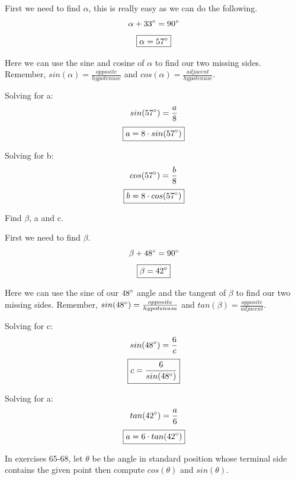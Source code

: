 \documentclass[10pt,letterpaper]{amspset}
\begin{document}
\begin{solution}[Solution]
First we need to find $\alpha$, this is really easy as we can do the following.
\[\alpha + 33\degree = 90\degree\]
\[\boxed{\alpha = 57\degree}\]

\noindent  Here we can use the sine and cosine of $\alpha$ to find our two missing sides. Remember, $sin(\alpha) = \frac{opposite}{hypotenuse}$ and $cos(\alpha) = \frac{adjacent}{hypotenuse}$. 
\bigskip

Solving for a:
\[sin(57\degree) = \frac{a}{8} \]
\[\boxed{a = 8 \cdot sin(57\degree)}\]

\bigskip

Solving for b:
\[cos(57\degree) = \frac{b}{8}\]
\[\boxed{b = 8 \cdot cos(57\degree)}\]
\end{solution}


\pagebreak


\begin{problem}[58.]
Find $\beta$, a and c.

\end{problem}

\begin{solution}[Solution]
First we need to find $\beta$.
\[\beta + 48\degree = 90\degree\]
\[\boxed{\beta = 42\degree}\]

\noindent  Here we can use the sine of our $48\degree$ angle and the tangent of $\beta$ to find our two missing sides. Remember, $sin(48\degree) = \frac{opposite}{hypotenuse}$ and $tan(\beta) = \frac{opposite}{adjacent}$. \bigskip

Solving for c:
\[sin(48\degree) = \frac{6}{c} \]
\[\boxed{c = \frac{6}{sin(48\degree)}}\]

\bigskip

Solving for a:
\[tan(42\degree) = \frac{a}{6}\]
\[\boxed{a = 6 \cdot tan(42\degree)}\]
\end{solution}


\pagebreak


In exercises 65-68, let $\theta$ be the angle in standard position whose terminal side contains the given
point then compute $cos(\theta)$ and $sin(\theta)$.
\end{document}
